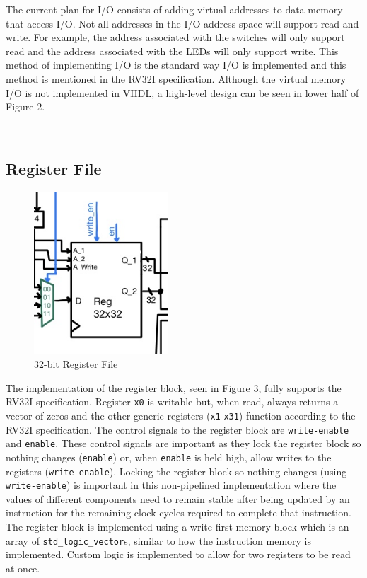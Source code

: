 \documentclass[lettersize,journal]{IEEEtran}
\begin{document}
The current plan for I/O consists of adding virtual addresses to data memory that access I/O.
Not all addresses in the I/O address space will support read and write.
For example, the address associated with the switches will only support read and the address associated with the LEDs will only support write.
This method of implementing I/O is the standard way I/O is implemented and this method is mentioned in the RV32I specification.
Although the virtual memory I/O is not implemented in VHDL, a high-level design can be seen in lower half of Figure 2.

\color{red}{Incomplete..}\color{black}\\
\subsection{Register File}
\begin{figure}[!h]
    \label{fig:regblock}
    \centering
    \includegraphics[width=5cm]{REG.jpg}
    \caption{32-bit Register File}
\end{figure}
The implementation of the register block, seen in Figure 3, fully supports the RV32I specification.
Register \verb|x0| is writable but, when read, always returns a vector of zeros and the other generic registers (\verb|x1|-\verb|x31|) function according to the RV32I specification.
The control signals to the register block are \verb|write-enable| and \verb|enable|.
These control signals are important as they lock the register block so nothing changes (\verb|enable|) or, when \verb|enable| is held high, allow writes to the registers (\verb|write-enable|).
Locking the register block so nothing changes (using \verb|write-enable|) is important in this non-pipelined implementation where the values of different components need to remain
 stable after being updated by an instruction for the remaining clock cycles required to complete that instruction.
The register block is implemented using a write-first memory block which is an array of \verb|std_logic_vector|s, similar to how the instruction memory is implemented.
Custom logic is implemented to allow for two registers to be read at once.
\end{document}
